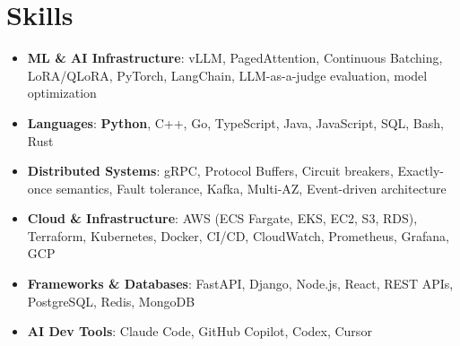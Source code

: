 \documentclass[letterpaper,11pt]{article}
\newcommand{\resumeSubHeadingListStart}{\begin{itemize}[leftmargin=0.15in, label={}]}
\newcommand{\resumeSubHeadingListEnd}{\end{itemize}}
\newcommand{\resumeSkillHeading}[2]{%
  \item\small{\textbf{#1}: #2 \vspace{-9pt}}%
}
\begin{document}
\section{Skills}
  \resumeSubHeadingListStart
    \resumeSkillHeading{ML \& AI Infrastructure}{vLLM, PagedAttention, Continuous Batching, LoRA/QLoRA, PyTorch, LangChain, LLM-as-a-judge evaluation, model optimization}
    \resumeSkillHeading{Languages}{\textbf{Python}, C++, Go, TypeScript, Java, JavaScript, SQL, Bash, Rust}
    \resumeSkillHeading{Distributed Systems}{gRPC, Protocol Buffers, Circuit breakers, Exactly-once semantics, Fault tolerance, Kafka, Multi-AZ, Event-driven architecture}
    \resumeSkillHeading{Cloud \& Infrastructure}{AWS (ECS Fargate, EKS, EC2, S3, RDS), Terraform, Kubernetes, Docker, CI/CD, CloudWatch, Prometheus, Grafana, GCP}
    \resumeSkillHeading{Frameworks \& Databases}{FastAPI, Django, Node.js, React, REST APIs, PostgreSQL, Redis, MongoDB}
    \resumeSkillHeading{AI Dev Tools}{Claude Code, GitHub Copilot, Codex, Cursor}
  \resumeSubHeadingListEnd
\end{document}
